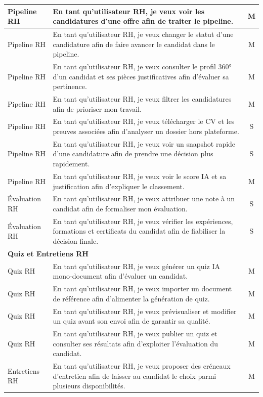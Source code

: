 \begin{longtable}{|p{3.5cm}|p{10cm}|c|}
Pipeline RH & En tant qu'utilisateur RH, je veux voir les candidatures d'une offre afin de traiter le pipeline. & M \\ \hline
Pipeline RH & En tant qu'utilisateur RH, je veux changer le statut d'une candidature afin de faire avancer le candidat dans le pipeline. & M \\ \hline
Pipeline RH & En tant qu'utilisateur RH, je veux consulter le profil 360° d'un candidat et ses pièces justificatives afin d'évaluer sa pertinence. & M \\ \hline
Pipeline RH & En tant qu'utilisateur RH, je veux filtrer les candidatures afin de prioriser mon travail. & M \\ \hline
Pipeline RH & En tant qu'utilisateur RH, je veux télécharger le CV et les preuves associées afin d'analyser un dossier hors plateforme. & S \\ \hline
Pipeline RH & En tant qu'utilisateur RH, je veux voir un snapshot rapide d'une candidature afin de prendre une décision plus rapidement. & S \\ \hline
Pipeline RH & En tant qu'utilisateur RH, je veux voir le score IA et sa justification afin d'expliquer le classement. & M \\ \hline
Évaluation RH & En tant qu'utilisateur RH, je veux attribuer une note à un candidat afin de formaliser mon évaluation. & S \\ \hline
Évaluation RH & En tant qu'utilisateur RH, je veux vérifier les expériences, formations et certificats du candidat afin de fiabiliser la décision finale. & S \\ \hline
\multicolumn{3}{|l|}{\textbf{Quiz et Entretiens RH}} \\ \hline
Quiz RH & En tant qu'utilisateur RH, je veux générer un quiz IA mono-document afin d'évaluer un candidat. & M \\ \hline
Quiz RH & En tant qu'utilisateur RH, je veux importer un document de référence afin d'alimenter la génération de quiz. & M \\ \hline
Quiz RH & En tant qu'utilisateur RH, je veux prévisualiser et modifier un quiz avant son envoi afin de garantir sa qualité. & M \\ \hline
Quiz RH & En tant qu'utilisateur RH, je veux publier un quiz et consulter ses résultats afin d'exploiter l'évaluation du candidat. & M \\ \hline
Entretiens RH & En tant qu'utilisateur RH, je veux proposer des créneaux d'entretien afin de laisser au candidat le choix parmi plusieurs disponibilités. & M \\ \hline

\end{longtable}
